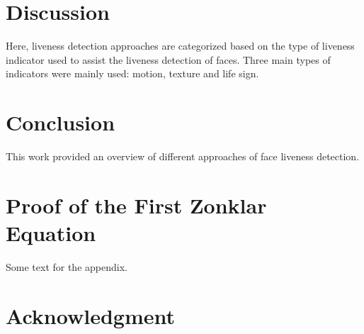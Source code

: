 \documentclass[journal]{IEEEtran}
\begin{document}
\section{Discussion}

Here, liveness detection approaches are categorized based on the type of liveness indicator used to assist the liveness detection of faces. Three main types of indicators were mainly used: motion, texture and life sign.



\section{Conclusion}

This work provided an overview of different approaches of face liveness detection.






%


\appendices
\section{Proof of the First Zonklar Equation}
Some text for the appendix.

\section*{Acknowledgment}
\end{document}
